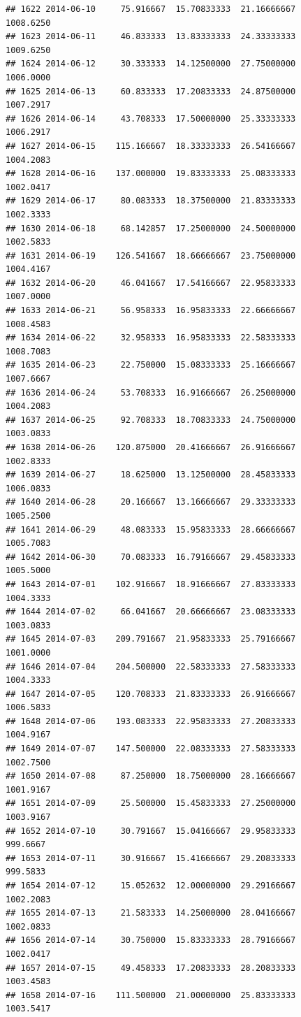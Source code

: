 \documentclass[
]{article}
\begin{document}
\begin{verbatim}
## 1622 2014-06-10     75.916667  15.70833333  21.16666667    1008.6250
## 1623 2014-06-11     46.833333  13.83333333  24.33333333    1009.6250
## 1624 2014-06-12     30.333333  14.12500000  27.75000000    1006.0000
## 1625 2014-06-13     60.833333  17.20833333  24.87500000    1007.2917
## 1626 2014-06-14     43.708333  17.50000000  25.33333333    1006.2917
## 1627 2014-06-15    115.166667  18.33333333  26.54166667    1004.2083
## 1628 2014-06-16    137.000000  19.83333333  25.08333333    1002.0417
## 1629 2014-06-17     80.083333  18.37500000  21.83333333    1002.3333
## 1630 2014-06-18     68.142857  17.25000000  24.50000000    1002.5833
## 1631 2014-06-19    126.541667  18.66666667  23.75000000    1004.4167
## 1632 2014-06-20     46.041667  17.54166667  22.95833333    1007.0000
## 1633 2014-06-21     56.958333  16.95833333  22.66666667    1008.4583
## 1634 2014-06-22     32.958333  16.95833333  22.58333333    1008.7083
## 1635 2014-06-23     22.750000  15.08333333  25.16666667    1007.6667
## 1636 2014-06-24     53.708333  16.91666667  26.25000000    1004.2083
## 1637 2014-06-25     92.708333  18.70833333  24.75000000    1003.0833
## 1638 2014-06-26    120.875000  20.41666667  26.91666667    1002.8333
## 1639 2014-06-27     18.625000  13.12500000  28.45833333    1006.0833
## 1640 2014-06-28     20.166667  13.16666667  29.33333333    1005.2500
## 1641 2014-06-29     48.083333  15.95833333  28.66666667    1005.7083
## 1642 2014-06-30     70.083333  16.79166667  29.45833333    1005.5000
## 1643 2014-07-01    102.916667  18.91666667  27.83333333    1004.3333
## 1644 2014-07-02     66.041667  20.66666667  23.08333333    1003.0833
## 1645 2014-07-03    209.791667  21.95833333  25.79166667    1001.0000
## 1646 2014-07-04    204.500000  22.58333333  27.58333333    1004.3333
## 1647 2014-07-05    120.708333  21.83333333  26.91666667    1006.5833
## 1648 2014-07-06    193.083333  22.95833333  27.20833333    1004.9167
## 1649 2014-07-07    147.500000  22.08333333  27.58333333    1002.7500
## 1650 2014-07-08     87.250000  18.75000000  28.16666667    1001.9167
## 1651 2014-07-09     25.500000  15.45833333  27.25000000    1003.9167
## 1652 2014-07-10     30.791667  15.04166667  29.95833333     999.6667
## 1653 2014-07-11     30.916667  15.41666667  29.20833333     999.5833
## 1654 2014-07-12     15.052632  12.00000000  29.29166667    1002.2083
## 1655 2014-07-13     21.583333  14.25000000  28.04166667    1002.0833
## 1656 2014-07-14     30.750000  15.83333333  28.79166667    1002.0417
## 1657 2014-07-15     49.458333  17.20833333  28.20833333    1003.4583
## 1658 2014-07-16    111.500000  21.00000000  25.83333333    1003.5417

\end{verbatim}
\end{document}
